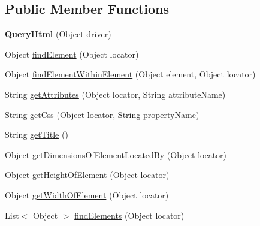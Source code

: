 \subsection*{Public Member Functions}
\begin{DoxyCompactItemize}
\item 
\hypertarget{classcom_1_1zeuslearning_1_1automation_1_1selenium_1_1interactions_1_1QueryHtml_aa9baccf52df5d14210e9bf5e5f161f18}{}\label{classcom_1_1zeuslearning_1_1automation_1_1selenium_1_1interactions_1_1QueryHtml_aa9baccf52df5d14210e9bf5e5f161f18} 
{\bfseries Query\+Html} (Object driver)
\item 
Object \hyperlink{classcom_1_1zeuslearning_1_1automation_1_1selenium_1_1interactions_1_1QueryHtml_a21ff6c1d862318a3e5beff87a1336a75}{find\+Element} (Object locator)
\item 
Object \hyperlink{classcom_1_1zeuslearning_1_1automation_1_1selenium_1_1interactions_1_1QueryHtml_ae9f39730724b96bc25230b5c5b55dec1}{find\+Element\+Within\+Element} (Object element, Object locator)
\item 
String \hyperlink{classcom_1_1zeuslearning_1_1automation_1_1selenium_1_1interactions_1_1QueryHtml_adfec4c777e003455fdc2a512d4a00959}{get\+Attributes} (Object locator, String attribute\+Name)
\item 
String \hyperlink{classcom_1_1zeuslearning_1_1automation_1_1selenium_1_1interactions_1_1QueryHtml_aeb4ba1cab004dc64db959c70a78fd0ab}{get\+Css} (Object locator, String property\+Name)
\item 
String \hyperlink{classcom_1_1zeuslearning_1_1automation_1_1selenium_1_1interactions_1_1QueryHtml_ad0bcb480f1543a6d81c3c83bd0a15773}{get\+Title} ()
\item 
Object \hyperlink{classcom_1_1zeuslearning_1_1automation_1_1selenium_1_1interactions_1_1QueryHtml_a57c813b972103a0a8160276012d202b2}{get\+Dimensions\+Of\+Element\+Located\+By} (Object locator)
\item 
Object \hyperlink{classcom_1_1zeuslearning_1_1automation_1_1selenium_1_1interactions_1_1QueryHtml_a768ebd5b4aac0a5de728e79a59ac9524}{get\+Height\+Of\+Element} (Object locator)
\item 
Object \hyperlink{classcom_1_1zeuslearning_1_1automation_1_1selenium_1_1interactions_1_1QueryHtml_a8e93f8a477d39f58357ab540e4ef78c1}{get\+Width\+Of\+Element} (Object locator)
\item 
List$<$ Object $>$ \hyperlink{classcom_1_1zeuslearning_1_1automation_1_1selenium_1_1interactions_1_1QueryHtml_a3161a36666e8a81d86855c82b39e20ce}{find\+Elements} (Object locator)

\end{DoxyCompactItemize}
